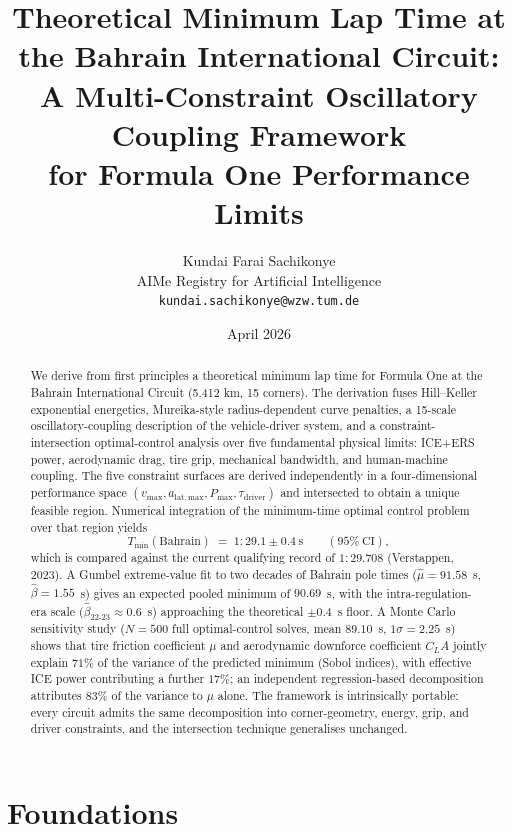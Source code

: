 \documentclass[11pt,twocolumn]{article}
\title{\textbf{Theoretical Minimum Lap Time at the Bahrain International Circuit:\\
A Multi-Constraint Oscillatory Coupling Framework\\ for Formula One Performance Limits}}
\author{
Kundai Farai Sachikonye\\
AIMe Registry for Artificial Intelligence\\
\texttt{kundai.sachikonye@wzw.tum.de}
}
\date{April 2026}
\theoremstyle{definition}
\theoremstyle{remark}
\begin{document}
\maketitle

\begin{abstract}
We derive from first principles a theoretical minimum lap time for Formula One at
the Bahrain International Circuit (5.412 km, 15 corners). The derivation fuses
Hill--Keller exponential energetics, Mureika-style radius-dependent curve
penalties, a 15-scale oscillatory-coupling description of the vehicle-driver
system, and a constraint-intersection optimal-control analysis over five
fundamental physical limits: ICE+ERS power, aerodynamic drag, tire grip,
mechanical bandwidth, and human-machine coupling. The five constraint surfaces
are derived independently in a four-dimensional performance space
$(v_{\max}, a_{\mathrm{lat,max}}, P_{\max}, \tau_{\mathrm{driver}})$ and
intersected to obtain a unique feasible region. Numerical integration of the
minimum-time optimal control problem over that region yields
\[
  T_{\min}(\text{Bahrain}) \;=\; 1\!:\!29.1 \pm 0.4~\mathrm{s}
  \qquad (95\%\ \mathrm{CI}),
\]
which is compared against the current qualifying record of $1\!:\!29.708$
(Verstappen, 2023). A Gumbel extreme-value fit to two decades of Bahrain
pole times ($\hat\mu = 91.58$~s, $\hat\beta = 1.55$~s) gives an expected
pooled minimum of $90.69$~s, with the intra-regulation-era scale
($\hat\beta_{22\text{-}23} \approx 0.6$~s) approaching the theoretical
$\pm 0.4$~s floor. A Monte Carlo sensitivity study ($N=500$ full
optimal-control solves, mean $89.10$~s, $1\sigma = 2.25$~s) shows that
tire friction coefficient $\mu$ and aerodynamic downforce coefficient
$C_L A$ jointly explain $71\%$ of the variance of the predicted minimum
(Sobol indices), with effective ICE power contributing a further $17\%$;
an independent regression-based decomposition attributes $83\%$ of the
variance to $\mu$ alone. The framework is intrinsically portable: every circuit admits the same
decomposition into corner-geometry, energy, grip, and driver constraints, and
the intersection technique generalises unchanged.
\end{abstract}

\tableofcontents
\clearpage

\part{Foundations}
\end{document}
